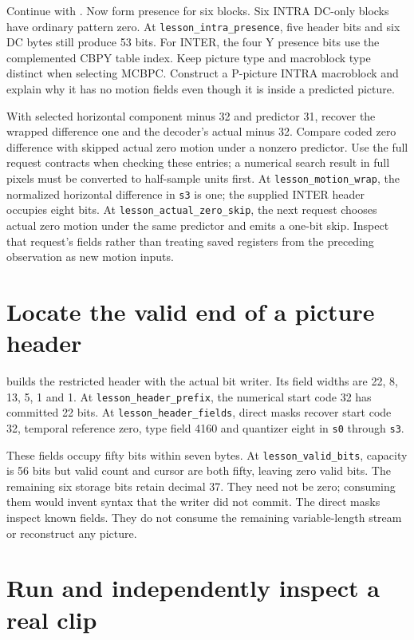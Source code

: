 Continue with . Now form presence for six blocks. Six INTRA DC-only blocks have ordinary pattern
zero. At \texttt{lesson\_intra\_presence}, five header bits and six DC bytes
still produce 53 bits. For INTER, the four Y presence bits use the complemented CBPY table index.
Keep picture type and macroblock type distinct when selecting MCBPC. Construct
a P-picture INTRA macroblock and explain why it has no motion fields even though
it is inside a predicted picture.

With selected horizontal component minus 32 and predictor 31, recover the wrapped
difference one and the decoder's actual minus 32. Compare coded zero difference
with skipped actual zero motion under a nonzero predictor. Use the full request
contracts when checking these entries; a numerical search result in full pixels
must be converted to half-sample units first. At
\texttt{lesson\_motion\_wrap}, the normalized horizontal difference in
\texttt{s3} is one; the supplied INTER header occupies eight bits. At
\texttt{lesson\_actual\_zero\_skip}, the next request chooses actual zero
motion under the same predictor and emits a one-bit skip. Inspect that request's
fields rather than treating saved registers from the preceding observation as new
motion inputs.

\section{Locate the valid end of a picture header}

 builds the restricted header with the actual bit
writer. Its field widths are 22, 8, 13, 5, 1 and 1. At
\texttt{lesson\_header\_prefix}, the numerical start code 32 has committed
22 bits. At \texttt{lesson\_header\_fields}, direct masks recover start
code 32, temporal reference zero, type field 4160 and quantizer eight in
\texttt{s0} through \texttt{s3}.

These fields occupy fifty bits within seven bytes. At
\texttt{lesson\_valid\_bits}, capacity is 56 bits but valid count and cursor
are both fifty, leaving zero valid bits. The remaining six storage bits retain
decimal 37. They need not be zero; consuming them would invent syntax that the
writer did not commit. The direct masks inspect known fields. They do not consume
the remaining variable-length stream or reconstruct any picture.

\section{Run and independently inspect a real clip}

